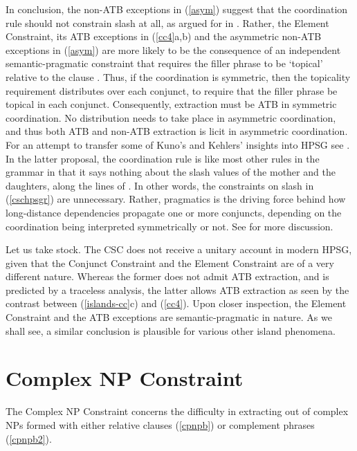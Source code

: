 \documentclass[output=paper
                ,modfonts
                ,nonflat
	        ,collection
	        ,collectionchapter
	        ,collectiontoclongg
 	        ,biblatex
                ,babelshorthands
                ,newtxmath
                ,draftmode
                ,colorlinks, citecolor=brown
]{./langsci/langscibook}
\begin{document}
In conclusion, the  non-ATB exceptions in (\ref{asym}) suggest that the coordination rule should not constrain {\sc slash} at all, as argued for in \citet{chaves}.  Rather,  the Element Constraint, its ATB exceptions in (\ref{cc4}a,b) and the asymmetric non-ATB exceptions in (\ref{asym}) are more likely to be the consequence of an independent semantic-pragmatic constraint that requires the filler phrase to be `topical'  relative to the clause \citep{lakoff86,kuno87,kehler,kubotalee}. Thus, if the coordination is  symmetric, then the topicality requirement  distributes over each conjunct, to require that the  filler phrase be topical in each conjunct. Consequently, extraction must
be ATB in symmetric coordination. No distribution needs to take place in asymmetric coordination, and thus both 
ATB and non-ATB extraction is licit in asymmetric coordination. For an attempt to transfer
some of Kuno's and Kehlers' insights into HPSG  see \citet{chaves}. In the latter proposal,
 the coordination rule is like most other rules in the grammar in that it says nothing about
the {\sc slash} values of the mother and the daughters, along the lines of 
\citet[354]{levhubook}. In other words, the constraints on {\sc slash} in (\ref{cschpsgr}) are unnecessary.  Rather, pragmatics is the driving force behind how  long-distance dependencies propagate one or more conjuncts, depending on the coordination being interpreted symmetrically or not. 
See  for more discussion.

Let us take stock. The CSC does not receive a unitary account in modern HPSG, given that the Conjunct Constraint and the Element Constraint  are of a very different nature. Whereas the former does not admit ATB extraction, and is predicted by a traceless analysis, the latter allows ATB extraction as seen by the contrast between  (\ref{islands-cc}c) and  (\ref{cc4}). 
Upon closer inspection, the Element Constraint and the ATB exceptions are semantic-pragmatic in nature.  As we shall see, a similar conclusion is plausible for various other island phenomena.


\section{Complex NP Constraint}

The Complex NP Constraint concerns the difficulty in extracting out of complex NPs formed with either relative clauses (\ref{cpnpb}) or complement phrases (\ref{cpnpb2}).

\eal \label{cpnpb}
\zlcont
\end{document}
